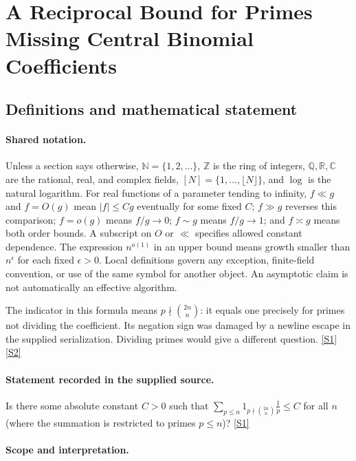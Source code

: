 \documentclass[11pt,a4paper]{article}
\newcommand{\N}{\mathbb{N}}
\newcommand{\Z}{\mathbb{Z}}
\newcommand{\Q}{\mathbb{Q}}
\newcommand{\R}{\mathbb{R}}
\newcommand{\C}{\mathbb{C}}
\newcommand{\sref}[2]{\hyperlink{source:#1:#2}{[S#2]}}
\begin{document}
\section{A Reciprocal Bound for Primes Missing Central Binomial Coefficients}\label{statement}


\subsection{Definitions and mathematical statement}

\paragraph{Shared notation.}Unless a section says otherwise, $\N=\{1,2,\ldots\}$,
$\Z$ is the ring of integers, $\Q,\R,\C$ are the rational, real, and complex
fields, $[N]=\{1,\ldots,\lfloor N\rfloor\}$, and $\log$ is the natural
logarithm. For real functions of a parameter tending to infinity,
$f\ll g$ and $f=O(g)$ mean $|f|\leq Cg$ eventually for some fixed $C$;
$f\gg g$ reverses this comparison; $f=o(g)$ means $f/g\to0$;
$f\sim g$ means $f/g\to1$; and $f\asymp g$ means both order bounds.
A subscript on $O$ or $\ll$ specifies allowed constant dependence.
The expression $n^{o(1)}$ in an upper bound means growth smaller than
$n^\epsilon$ for each fixed $\epsilon>0$. Local definitions govern any
exception, finite-field convention, or use of the same symbol for another
object. An asymptotic claim is not automatically an effective algorithm.



The indicator in this formula means $p\nmid\binom{2n}{n}$: it equals one precisely for primes not dividing the coefficient. Its negation sign was damaged by a newline escape in the supplied serialization. Dividing primes would give a different question. \sref{statement}{1} \sref{statement}{2}

\paragraph{Statement recorded in the supplied source.}
Is there some absolute constant $C>0$ such that $ \sum_{p\leq n}1_{p\nmid \binom{2n}{n}}\frac{1}{p}\leq C $ for all $n$ (where the summation is restricted to primes $p\leq n$)? \sref{statement}{1}

\paragraph{Scope and interpretation.}
\end{document}
